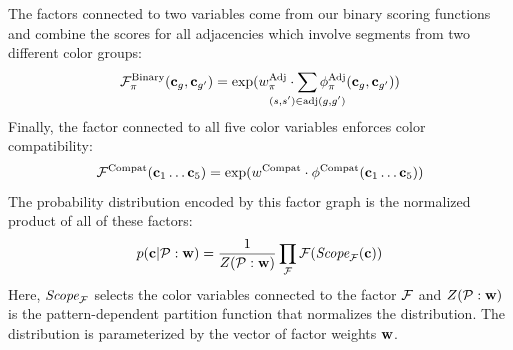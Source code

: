 The factors connected to two variables come from our binary scoring functions and combine the scores for all adjacencies which involve segments from two different color groups:
\begin{equation*}
\factor^{\textrm{Binary}}_\prop(\colors_\group, \colors_\groupprime) =
	\exp( \adjTermWeight \cdot \sum_{\mathclap{(\segment, \segprime) \in \adj(\group, \groupprime)}} \adjInstStats( \colors_\group, \colors_\groupprime))
\end{equation*}
Finally, the factor connected to all five color variables enforces color compatibility:
\begin{equation*}
\mathcal{F}^{\textrm{Compat}}(\mathbf{c}_1 \ldots \mathbf{c}_5) = \exp(w^{\textrm{Compat}} \cdot \phi^{\textrm{Compat}}(\mathbf{c}_1 \ldots \mathbf{c}_5))
\end{equation*}
The probability distribution encoded by this factor graph is the normalized product of all of these factors:
\begin{equation*}
p(\mathbf{c} | \mathcal{P} : \mathbf{w}) = \frac{1}{Z(\mathcal{P} : \mathbf{w})} \prod_{\mathcal{F}} \mathcal{F}(\textit{Scope}_{\mathcal{F}}(\mathbf{c}))
\end{equation*}
Here, $\textit{Scope}_{\mathcal{F}}$ selects the color variables connected to the factor $\mathcal{F}$ and $Z(\mathcal{P} : \mathbf{w})$ is the pattern-dependent partition function that normalizes the distribution. The distribution is parameterized by the vector of factor weights $\mathbf{w}$.

